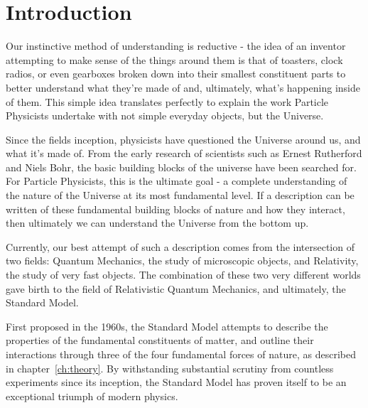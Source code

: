 
\chapter{Introduction}  %

\ifpdf
    \graphicspath{{Chapter1/Figs/Raster/}{Chapter1/Figs/PDF/}{Chapter1/Figs/}}
\else
    \graphicspath{{Chapter1/Figs/Vector/}{Chapter1/Figs/}}
\fi


\label{sec:introduction_intro}

Our instinctive method of understanding is reductive - the idea of an
inventor attempting to make sense of the things around them is
that of toasters, clock radios, or even gearboxes broken down into
their smallest constituent parts to better understand what they're made of and,
ultimately, what's happening inside of them. This simple idea translates
perfectly to explain the work Particle Physicists undertake with
not simple everyday objects, but the Universe.

Since the fields inception, physicists have questioned the Universe
around us, and what it's made of. From the early research of scientists such as
Ernest Rutherford and Niels Bohr, the basic building
blocks of the universe have been searched for. For Particle Physicists, this is
the ultimate goal - a complete understanding of the nature of the Universe
at its most
fundamental level. If a description can be written of these fundamental
building blocks of
nature and how they interact, then ultimately we can understand
the Universe from the bottom up.

Currently, our best attempt of such a description comes from the intersection of
two
fields: Quantum Mechanics, the study of microscopic objects, and Relativity, the
study of very fast objects. The combination of these
two very different worlds gave birth to the field of Relativistic
Quantum Mechanics, and ultimately, the Standard Model.

First proposed in the 1960s, the Standard Model attempts to describe the
properties of the fundamental constituents of matter, and outline their
interactions through three of the four fundamental forces of nature, as
described in chapter~\ref{ch:theory}.
By withstanding substantial scrutiny from countless experiments since its
inception, the Standard Model has proven itself to be an exceptional
triumph of modern physics.


